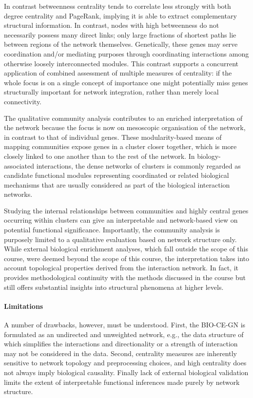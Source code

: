 In contrast betweenness centrality tends to correlate less strongly with both degree centrality and PageRank, implying it is able to extract complementary structural information. In contrast, nodes with high betweenness do not necessarily possess many direct links; only large fractions of shortest paths lie between regions of the network themselves. Genetically, these genes may serve coordination and/or mediating purposes through coordinating interactions among otherwise loosely interconnected modules. This contrast supports a concurrent application of combined assessment of multiple measures of centrality: if the whole focus is on a single concept of importance one might potentially miss genes structurally important for network integration, rather than merely local connectivity.

The qualitative community analysis contributes to an enriched interpretation of the network because the focus is now on mesoscopic organisation of the network, in contrast to that of individual genes. These modularity-based means of mapping communities expose genes in a cluster closer together, which is more closely linked to one another than to the rest of the network. In biology-associated interactions, the dense networks of clusters is commonly regarded as candidate functional modules representing coordinated or related biological mechanisms that are usually considered as part of the biological interaction networks.

Studying the internal relationships between communities and highly central genes occurring within clusters can give an interpretable and network-based view on potential functional significance. Importantly, the community analysis is purposely limited to a qualitative evaluation based on network structure only. While external biological enrichment analyses, which fall outside the scope of this course, were deemed beyond the scope of this course, the interpretation takes into account topological properties derived from the interaction network. In fact, it provides methodological continuity with the methods discussed in the course but still offers substantial insights into structural phenomena at higher levels.

\paragraph{Limitations}

A number of drawbacks, however, must be understood. First, the BIO-CE-GN is formulated as an undirected and unweighted network, e.g., the data structure of which simplifies the interactions and directionality or a strength of interaction may not be considered in the data. Second, centrality measures are inherently sensitive to network topology and preprocessing choices, and high centrality does not always imply biological causality. Finally lack of external biological validation limits the extent of interpretable functional inferences made purely by network structure.

